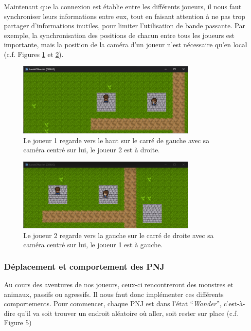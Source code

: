 Maintenant que la connexion est établie entre les différents joueurs, il nous faut synchroniser leurs informations entre eux, tout en faisant attention à ne pas trop partager d'informations inutiles, pour limiter l'utilisation de bande passante.
Par exemple, la synchronisation des positions de chacun entre tous les joueurs est importante, mais la position de la caméra d'un joueur n'est nécessaire qu'en local (c.f. Figures \ref*{fig:gameplay3} et \ref*{fig:gameplay4}).

\begin{figure}[H]
    \centering
    \includegraphics[width=0.8\textwidth]{2.game/assets/gameplay3.png}
    \caption{Le joueur 1 regarde vers le haut sur le carré de gauche avec sa caméra centré sur lui, le joueur 2 est à droite.}
    \label{fig:gameplay3}
\end{figure}

\begin{figure}[H]
    \centering
    \includegraphics[width=0.8\textwidth]{2.game/assets/gameplay4.png}
    \caption{Le joueur 2 regarde vers la gauche sur le carré de droite avec sa caméra centré sur lui, le joueur 1 est à gauche.}
    \label{fig:gameplay4}
\end{figure}


\subsubsection*{Déplacement et comportement des PNJ}

Au cours des aventures de nos joueurs, ceux-ci rencontreront des monstres et animaux, passifs ou agressifs.
Il nous faut donc implémenter ces différents comportements.
Pour commencer, chaque PNJ est dans l'état “\textit{Wander}”, c'est-à-dire qu'il va soit trouver un endroit aléatoire où aller, soit rester sur place (c.f. Figure 5)

